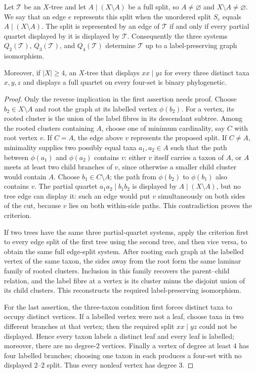 \documentclass[12pt]{article}
\begin{document}
\begin{lemma}\label{lem:partial-reconstruction}
Let $\mathcal T$ be an $X$-tree and let $A\mid(X\setminus A)$ be a full
split, so $A\ne\varnothing$ and $X\setminus A\ne\varnothing$.  We say that
an edge $e$ represents this split when the unordered split $S_e$ equals
$A\mid(X\setminus A)$.  The split is represented by an edge of $\mathcal T$
if and only if every partial quartet displayed by it is displayed by
$\mathcal T$.  Consequently the three systems $Q_2(\mathcal T)$,
$Q_3(\mathcal T)$, and $Q_4(\mathcal T)$ determine $\mathcal T$ up to a
label-preserving graph isomorphism.

Moreover, if $|X|\ge4$, an $X$-tree that displays $xx\mid yz$ for every
three distinct taxa $x,y,z$ and displays a full quartet on every four-set is
binary phylogenetic.
\end{lemma}

\begin{proof}
Only the reverse implication in the first assertion needs proof.  Choose
$b_2\in X\setminus A$ and root the graph at its labelled vertex $\phi(b_2)$.
For a vertex, its rooted cluster is the union of the label fibres in its
descendant subtree.  Among the rooted clusters containing $A$, choose one of
minimum cardinality, say $C$ with root vertex $v$.
If $C=A$, the edge above $v$ represents the proposed split.  If $C\ne A$,
minimality supplies two possibly equal taxa $a_1,a_2\in A$ such that the path
between $\phi(a_1)$ and $\phi(a_2)$ contains $v$: either $v$ itself carries a
taxon of $A$, or $A$ meets
at least two child branches of $v$, since otherwise a smaller child cluster
would contain $A$.  Choose $b_1\in C\setminus A$; the path from
$\phi(b_2)$ to $\phi(b_1)$ also contains $v$.  The partial quartet
$a_1a_2\mid b_1b_2$ is displayed by $A\mid(X\setminus A)$, but no tree edge
can display it: such an edge would put $v$ simultaneously on both sides of
the cut, because $v$ lies on both within-side paths.  This contradiction
proves the criterion.

If two trees have the same three partial-quartet systems, apply the criterion
first to every edge split of the first tree using the second tree, and then
vice versa, to obtain the same full edge-split system.  After rooting each
graph at the labelled vertex of the same taxon, the sides away from the root
form the same
laminar family of rooted clusters.  Inclusion in this family recovers the
parent--child relation, and the label fibre at a vertex is its cluster minus
the disjoint union of its child clusters.  This reconstructs the required
label-preserving isomorphism.

For the last assertion, the three-taxon condition first forces distinct taxa
to occupy distinct vertices.  If a labelled vertex were not a leaf, choose
taxa in two different branches at that vertex; then the required split
$xx\mid yz$ could not be displayed.  Hence every taxon labels a distinct
leaf and every leaf is labelled; moreover, there are no degree-$2$ vertices.
Finally a vertex of degree at
least $4$ has four labelled branches; choosing one taxon in each produces a
four-set with no displayed $2$--$2$ split.  Thus every nonleaf vertex has
degree $3$.
\end{proof}
\end{document}
